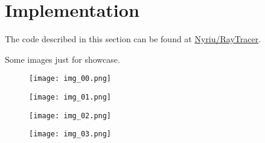 
\section{Implementation}
\noindent
The code described in this section can be found at
\href{https://github.com/Nyriu/RayTracer}{Nyriu/RayTracer}.

\noindent
Some images just for showcase.

\begin{figure}[!htb]
  \centering
  \texttt{[image: img\_00.png]}
\end{figure}

\begin{figure}[!htb]
  \centering
  \texttt{[image: img\_01.png]}
\end{figure}

\begin{figure}[!htb]
  \centering
  \texttt{[image: img\_02.png]}
\end{figure}

\begin{figure}[!htb]
  \centering
  \texttt{[image: img\_03.png]}
\end{figure}


